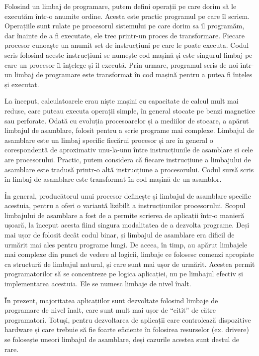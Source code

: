 Folosind un limbaj de programare, putem defini operații pe care dorim să le
executăm într-o anumite ordine. Acesta este practic programul pe care îl scriem.
Operațiile sunt rulate pe procesorul sistemului pe care dorim sa îl programăm,
dar înainte de a fi executate, ele trec printr-un proces de transformare.
Fiecare procesor cunoaște un anumit set de instrucțiuni pe care le poate
executa. Codul scris folosind aceste instrucțiuni se numește cod mașină și este
singurul limbaj pe care un procesor îl înțelege și îl execută. Prin urmare,
programul scris de noi într-un limbaj de programare este transformat în cod
mașină pentru a putea fi înțeles și executat.

La început, calculatoarele erau niște mașini cu capacitate de calcul mult mai
reduse, care puteau executa operații simple, în general stocate pe benzi
magnetice sau perforate. Odată cu evoluția procesoarelor și a mediilor de
stocare, a apărut limbajul de asamblare, folosit pentru a scrie programe mai
complexe. Limbajul de asamblare este un limbaj specific fiecărui procesor și are
în general o corespondență de aproximativ unu-la-unu între instrucțiunile de
asamblare și cele are procesorului. Practic, putem considera că fiecare
instrucțiune a limbajului de asamblare este tradusă printr-o altă instrucțiune a
procesorului. Codul sursă scris în limbaj de asamblare este transformat în cod
mașină de un asamblor.

În general, producătorul unui procesor definește și limbajul de asamblare
specific acestuia, pentru a oferi o variantă lizibilă a instrucțiunilor
procesorului. Scopul limbajului de asamblare a fost de a permite scrierea de
aplicații într-o manieră ușoară, la început acesta fiind singura modalitatea de
a dezvolta programe. Deși mai ușor de folosit decât codul binar, și limbajul de
asamblare era dificil de urmărit mai ales pentru programe lungi. De aceea, în
timp, au apărut limbajele mai complexe din punct de vedere al logicii, limbaje
ce folosesc comenzi apropiate ca structură de limbajul natural, și care sunt mai
ușor de urmărit. Acestea permit programatorilor să se concentreze pe logica
aplicației, nu pe limbajul efectiv și implementarea acestuia. Ele se numesc
limbaje de nivel înalt.

În prezent, majoritatea aplicațiilor sunt dezvoltate folosind limbaje de
programare de nivel înalt, care sunt mult mai ușor de “citit” de către
programatori. Totuși, pentru dezvoltarea de aplicații care controlează
dispozitive hardware și care trebuie să fie foarte eficiente în folosirea
resurselor (ex. drivere) se folosește uneori limbajul de asamblare, deși
cazurile acestea sunt destul de rare.

